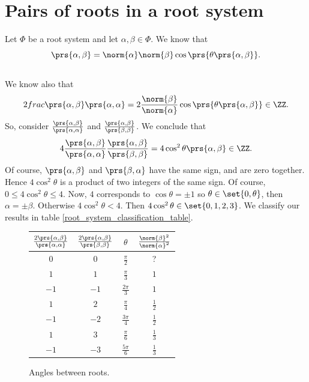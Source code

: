 \documentclass[10pt,a4paper,twoside,openany,hidelinks]{book}
\begin{document}
\section{Pairs of roots in a root system}

Let $\Phi$ be a root system and let $\alpha,\beta \in \Phi$. We know that \[\prs{\alpha,\beta} = \norm{\alpha}\norm{\beta} \cos\prs{\theta\prs{\alpha,\beta}}\text{.}\]\\
We know also that \[2\\frac{\prs{\alpha,\beta}}{\prs{\alpha,\alpha}} = 2 \frac{\norm{\beta}}{\norm{\alpha}} \cos\prs{\theta\prs{\alpha,\beta}} \in \ZZ \text{.}\]
So, consider $\frac{\prs{\alpha,\beta}}{\prs{\alpha,\alpha}}$ and $\frac{\prs{\alpha,\beta}}{\prs{\beta,\beta}}$. We conclude that
\[4 \frac{\prs{\alpha,\beta}}{\prs{\alpha,\alpha}} \frac{\prs{\alpha,\beta}}{\prs{\beta,\beta}} = 4\cos^2 \theta\prs{\alpha,\beta} \in \ZZ \text{.}\]
Of course, $\prs{\alpha,\beta}$ and $\prs{\beta,\alpha}$ have the same sign, and are zero together. Hence
$4 \cos^2\theta$ is a product of two integers of the same sign.
Of course, $0 \leq 4\cos^2 \theta \leq 4$. Now, $4$ corresponds to $\cos\theta = \pm 1$ so $\theta \in \set{0,\theta}$, then $\alpha = \pm \beta$. Otherwise $4 \cos^2 \theta < 4$. Then $4\cos^2 \theta \in \set{0,1,2,3}$.
We classify our results in table \ref{root_system_classification_table}.

\begin{figure}[h!]
\caption{Angles between roots.}
\label{root_system_classification_table}
\centering
\begin{tabular}{c|c|c|c} \label{classification table}
$\frac{2 \prs{\alpha,\beta}}{\prs{\alpha,\alpha}}$ & $\frac{2\prs{\alpha,\beta}}{\prs{\beta,\beta}}$ & $\theta$ & $\frac{\norm{\beta}^2}{\norm{\alpha}^2}$\\
\hline
\hline
$0$ & $0$ & $\frac{\pi}{2}$ & ? \\
\hline
$1$ & $1$ & $\frac{\pi}{3}$ & $1$ \\
\hline
$-1$ & $-1$ & $\frac{2\pi}{3}$ & $1$ \\
\hline
$1$ & $2$ & $\frac{\pi}{4}$ & $\frac{1}{2}$ \\
\hline
$-1$ & $-2$ & $\frac{3\pi}{4}$ & $\frac{1}{2}$ \\
\hline
$1$ & $3$ & $\frac{\pi}{6}$ & $\frac{1}{3}$ \\
\hline
$-1$ & $-3$ & $\frac{5\pi}{6}$ & $\frac{1}{3}$
\end{tabular}
\end{figure}
\end{document}
